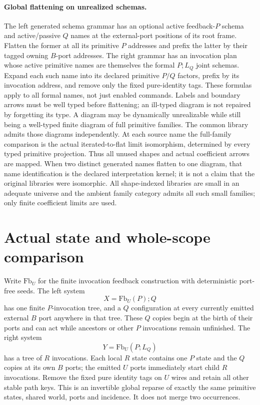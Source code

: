 \documentclass[11pt]{article}
\begin{document}
\paragraph{Global flattening on unrealized schemas.} The left generated schema grammar has an optional active feedback-$P$ schema and active/passive $Q$ names at the external-port positions of its root frame. Flatten the former at all its primitive $P$ addresses and prefix the latter by their tagged owning $B$-port addresses. The right grammar has an invocation plan whose active primitive names are themselves the formal $P;L_Q$ joint schemas. Expand each such name into its declared primitive $P/Q$ factors, prefix by its invocation address, and remove only the fixed pure-identity tags. These formulas apply to all formal names, not just enabled commands. Labels and boundary arrows must be well typed before flattening; an ill-typed diagram is not repaired by forgetting its type. A diagram may be dynamically unrealizable while still being a well-typed finite diagram of full primitive families. The common library admits those diagrams independently. At each source name the full-family comparison is the actual iterated-to-flat limit isomorphism, determined by every typed primitive projection. Thus all unused shapes and actual coefficient arrows are mapped. When two distinct generated names flatten to one diagram, that name identification is the declared interpretation kernel; it is not a claim that the original libraries were isomorphic. All shape-indexed libraries are small in an adequate universe and the ambient family category admits all such small families; only finite coefficient limits are used.

\section{Actual state and whole-scope comparison}
Write $\mathrm{Fb}_U$ for the finite invocation feedback construction with deterministic port-free seeds. The left system
\[
 X=\mathrm{Fb}_U(P);Q
\]
has one finite $P$-invocation tree, and a $Q$ configuration at every currently emitted external $B$ port anywhere in that tree. These $Q$ copies begin at the birth of their ports and can act while ancestors or other $P$ invocations remain unfinished. The right system
\[
 Y=\mathrm{Fb}_U(P;L_Q)
\]
has a tree of $R$ invocations. Each local $R$ state contains one $P$ state and the $Q$ copies at its own $B$ ports; the emitted $U$ ports immediately start child $R$ invocations. Remove the fixed pure identity tags on $U$ wires and retain all other stable path keys. This is an invertible global reparse of exactly the same primitive states, shared world, ports and incidence. It does not merge two occurrences.
\end{document}
